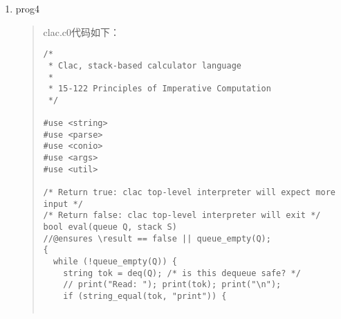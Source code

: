 \documentclass[]{article}
\begin{document}
\begin{enumerate}
\def\labelenumi{\arabic{enumi}.}
\item
  prog4

  \begin{quote}
  clac.c0代码如下：

\begin{verbatim}
/*
 * Clac, stack-based calculator language
 *
 * 15-122 Principles of Imperative Computation
 */

#use <string>
#use <parse>
#use <conio>
#use <args>
#use <util>

/* Return true: clac top-level interpreter will expect more input */
/* Return false: clac top-level interpreter will exit */
bool eval(queue Q, stack S)
//@ensures \result == false || queue_empty(Q);
{
  while (!queue_empty(Q)) {
    string tok = deq(Q); /* is this dequeue safe? */
    // print("Read: "); print(tok); print("\n");
    if (string_equal(tok, "print")) {


\end{verbatim}
\end{quote}
\end{enumerate}
\end{document}
